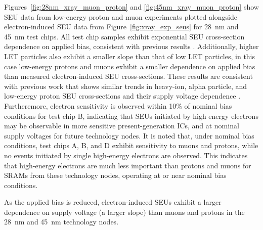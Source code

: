 Figures~\ref{fig:28nm_xray_muon_proton} and \ref{fig:45nm_xray_muon_proton} show SEU data from low-energy proton and muon experiments plotted alongside electron-induced SEU data from Figure~\ref{fig:xray_exp_seus} for 28~nm and 45~nm test chips. 
All test chip samples exhibit exponential SEU cross-section dependence on applied bias, consistent with previous results \cite{Rodbell:2007vl, Sierawski:2010cj}. 
Additionally, higher LET particles also exhibit a smaller slope than that of low LET particles, in this case low-energy protons and muons exhibit a smaller dependence on applied bias than measured electron-induced SEU cross-sections.
These results are consistent with previous work that shows similar trends in heavy-ion, alpha particle, and low-energy proton SEU cross-sections and their supply voltage dependence \cite{buehler1990alpha,barak1999scaling,barak2004use,Rodbell:2007vl}. 
Furtheremore, electron sensitivity is observed within 10\% of nominal bias conditions for test chip B, indicating that SEUs initiated by high energy electrons may be observable in more sensitive present-generation ICs, and at nominal supply voltages for future technology nodes.
It is noted that, under nominal bias conditions, test chips A, B, and D exhibit sensitivity to muons and protons, while no events initiated by single high-energy electrons are observed. 
This indicates that high-energy electrons are much less important than protons and muons for SRAMs from these technology nodes, operating at or near nominal bias conditions.

As the applied bias is reduced, electron-induced SEUs exhibit a larger dependence on supply voltage (a larger slope) than muons and protons in the 28~nm and 45~nm technology nodes.

